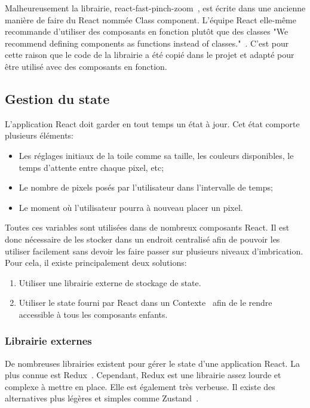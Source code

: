 Malheureusement la librairie, react-fast-pinch-zoom~\cite{react-fast-pinch-zoom}, est écrite dans une ancienne manière de faire du React nommée Class component. L'équipe React elle-même recommande d'utiliser des composants en fonction plutôt que des classes "We recommend defining components as functions instead of classes."~\cite{react-class-component}. C'est pour cette raison que le code de la librairie a été copié dans le projet et adapté pour être utilisé avec des composants en fonction.

\subsection{Gestion du state}

L'application React doit garder en tout temps un état à jour. Cet état comporte plusieurs éléments:

\begin{itemize}
  \item Les réglages initiaux de la toile comme sa taille, les couleurs disponibles, le temps d'attente entre chaque pixel, etc;
  \item Le nombre de pixels posés par l'utilisateur dans l'intervalle de temps;
  \item Le moment où l'utilisateur pourra à nouveau placer un pixel.
\end{itemize}

Toutes ces variables sont utilisées dans de nombreux composants React. Il est donc nécessaire de les stocker dans un endroit centralisé afin de pouvoir les utiliser facilement sans devoir les faire passer sur plusieurs niveaux d'imbrication. Pour cela, il existe principalement deux solutions:

\begin{enumerate}
  \item Utiliser une librairie externe de stockage de state.
  \item Utiliser le state fourni par React dans un Contexte~\cite{react-context} afin de le rendre accessible à tous les composants enfants.
\end{enumerate}

\subsubsection{Librairie externes}

De nombreuses librairies existent pour gérer le state d'une application React. La plus connue est Redux~\cite{react-redux}. Cependant, Redux est une librairie assez lourde et complexe à mettre en place. Elle est également très verbeuse. Il existe des alternatives plus légères et simples comme Zustand~\cite{zustand}.

